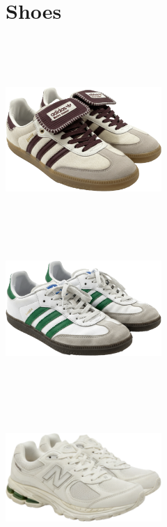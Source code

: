 \documentclass[10pt]{article}
\begin{document}
\section*{Shoes}\
\vspace*{2mm}\noindent
\begin{minipage}[c][59.33mm][c]{59.33mm}\centering
\includegraphics[width=59.33mm,height=59.33mm,keepaspectratio]{assets/shoes/adidas-samba-white-bordeaux.png}\
\end{minipage} \hspace*{6.00mm} \begin{minipage}[c][59.33mm][c]{59.33mm}\centering
\includegraphics[width=59.33mm,height=59.33mm,keepaspectratio]{assets/shoes/adidas-samba-white-green.png}\
\end{minipage} \hspace*{6.00mm} \begin{minipage}[c][59.33mm][c]{59.33mm}\centering
\includegraphics[width=59.33mm,height=59.33mm,keepaspectratio]{assets/shoes/new-balance-white.png}\

\end{minipage}
\end{document}

